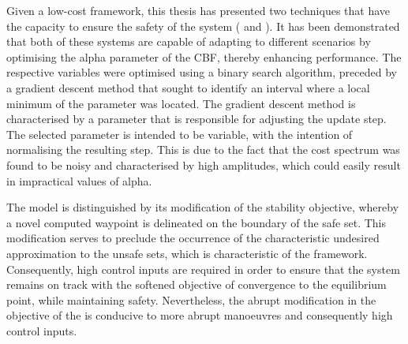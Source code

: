 Given a low-cost  framework, this thesis has presented two techniques that have the capacity to ensure the safety of the system ( and ). It has been demonstrated that both of these systems are capable of adapting to different scenarios by optimising the alpha parameter of the CBF, thereby enhancing performance. The respective variables were optimised using a binary search algorithm, preceded by a gradient descent method that sought to identify an interval where a local minimum of the parameter was located. The gradient descent method is characterised by a parameter that is responsible for adjusting the update step. The selected parameter is intended to be variable, with the intention of normalising the resulting step. This is due to the fact that the cost spectrum was found to be noisy and characterised by high amplitudes, which could easily result in impractical values of alpha. 

The  model is distinguished by its modification of the stability objective, whereby a novel computed waypoint is delineated on the boundary of the safe set. This modification serves to preclude the occurrence of the characteristic undesired approximation to the unsafe sets, which is characteristic of the   framework. Consequently, high control inputs are required in order to ensure that the system remains on track with the softened objective of convergence to the equilibrium point, while maintaining safety. Nevertheless, the abrupt modification in the objective of the  is conducive to more abrupt manoeuvres and consequently high control inputs.   

